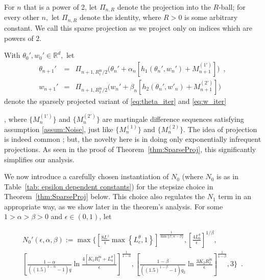 \documentclass[usenames,dvipsnames,final,12pt]{colt2018} %
\newcommand{\dReal}{\mathbb{R}^d}
\newcommand{\st}{\alpha}
\newcommand{\Rti}{R_1^{\textrm{in}}}
\newcommand{\Kt}{K_1}
\newcommand{\Lt}[1]{L^{\theta}_{#1}}
\newcommand{\sw}{\beta}
\newcommand{\lz}{q_2}
\newcommand{\Rzi}{R_2^{\textrm{in}}}
\newcommand{\Lz}{L^z}
\newcommand{\Kz}{K_2}
\newcommand{\lm}{q}
\newcommand{\gal}[1]{#1}
\newcommand{\gugan}[1]{#1}
\begin{document}
For $n$ that is a power of 2, let $\Pi_{n,R}$ denote the projection into the $R$-ball; for every other $n,$ let $\Pi_{n,R}$ denote the identity{, where $R>0$ is some arbitrary constant}.  {We call this sparse projection as we project only on indices which are powers of $2$.}
%
\gal{
With $\theta_0', w_0' \in \dReal,$ let
%
\begin{eqnarray}
%
\theta_{n + 1}' & = & \Pi_{n + 1,\Rti/2}\Big(\theta_n' + \st_n [h_1(\theta_n', w_n') + M_{n + 1}^{(1')}]\Big) \enspace, \label{eq:thetap_iter} \\
%
w_{n + 1}' & = & \Pi_{n + 1,\Rzi/2}\Big(w_n' + \sw_n [h_2(\theta_n', w'_n) + M_{n + 1}^{(2')}]\Big) \label{eq:wp_iter}
\end{eqnarray}
%
denote the sparsely projected variant of \eqref{eq:theta_iter} and \eqref{eq:w_iter}%
}
{, where $\{M^{(1')}_{n}\}$ and $\{M^{(2')}_{n}\}$ are martingale difference sequences satisfying assumption \ref{assum:Noise}, just like $\{M^{(1)}_{n}\}$ and $\{M^{(2)}_{n}\}$.} The \gugan{idea} of projection is indeed common \citep{borkar2008stochastic,kushner1980projected}; \gugan{but, the novelty here is in doing only exponentially infrequent projections.} As seen in the proof of Theorem~\ref{thm:SparseProj}, this significantly simplifies our analysis.

{ \gugan{We now} introduce a carefully chosen instantiation of $N_0$ (where $N_0$ is \gugan{as} in Table~\ref{tab: epsilon dependent constants}) for the stepsize choice in Theorem~\ref{thm:SparseProj} below. This choice also regulates the $N_1$ term in an appropriate way, as we show later in the theorem's analysis.}
For some $1>\alpha>\beta>0$ and $\epsilon \in (0,1)$, \gugan{let
	
	\begin{multline}
	N_0'(\epsilon,\alpha,\beta)
	:=
	\max \Bigg\{\left[ \tfrac{8\Lz}{\epsilon} \max\left\{\Lt{c}, 1\right\}
	\right]^{\frac{1}{\min\{\beta,\alpha-\beta\}}},  \left[\tfrac{4\Lt{b}}{\epsilon}\right]^{1/\beta},  \\
	\left[
	\tfrac{1-\alpha}{((1.5)^{1-\alpha}-1)\lm}
	\ln\tfrac{4[\Kt \Rti + \Lt{a}]}{\epsilon}
	\right]^{\frac{1}{1-\alpha}}, \left[
	\tfrac{1-\beta}{((1.5)^{1-\beta}-1)\lz}
	\ln\tfrac{3\Kz \Rzi}{\epsilon}
	\right]^{\frac{1}{1-\beta}}, 3
	\bigg\} \enspace.
	\label{eq: N0' defn}
	\end{multline}
}
\end{document}
